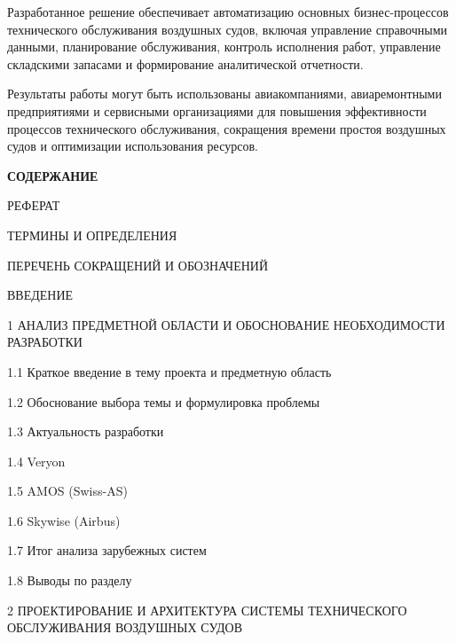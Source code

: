 \documentclass[14pt,a4paper]{extarticle}
\newcommand{\headersection}[1]{
  \begin{center}
    \textbf{\MakeUppercase{#1}}
  \end{center}
  \addcontentsline{toc}{section}{#1}
}
\begin{document}
Разработанное решение обеспечивает автоматизацию основных бизнес-процессов технического обслуживания воздушных судов, включая управление справочными данными, планирование обслуживания, контроль исполнения работ, управление складскими запасами и формирование аналитической отчетности.

Результаты работы могут быть использованы авиакомпаниями, авиаремонтными предприятиями и сервисными организациями для повышения эффективности процессов технического обслуживания, сокращения времени простоя воздушных судов и оптимизации использования ресурсов.

\clearpage

\headersection{СОДЕРЖАНИЕ}

\begingroup
\sloppy
\raggedright
\begin{flushleft}

РЕФЕРАТ 

ТЕРМИНЫ И ОПРЕДЕЛЕНИЯ 

ПЕРЕЧЕНЬ СОКРАЩЕНИЙ И ОБОЗНАЧЕНИЙ 

ВВЕДЕНИЕ 

1 АНАЛИЗ ПРЕДМЕТНОЙ ОБЛАСТИ И ОБОСНОВАНИЕ НЕОБХОДИМОСТИ\\
РАЗРАБОТКИ 

\hspace{0.63cm}1.1 Краткое введение в тему проекта и предметную область 

\hspace{0.63cm}1.2 Обоснование выбора темы и формулировка проблемы 

\hspace{0.63cm}1.3 Актуальность разработки 

\hspace{0.63cm}1.4 Veryon 

\hspace{0.63cm}1.5 AMOS (Swiss-AS) 

\hspace{0.63cm}1.6 Skywise (Airbus) 

\hspace{0.63cm}1.7 Итог анализа зарубежных систем 

\hspace{0.63cm}1.8 Выводы по разделу 

2 ПРОЕКТИРОВАНИЕ И АРХИТЕКТУРА СИСТЕМЫ ТЕХНИЧЕСКОГО\\
ОБСЛУЖИВАНИЯ ВОЗДУШНЫХ СУДОВ 


\end{flushleft}
\end{document}
